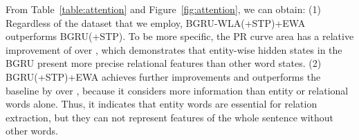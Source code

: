 \documentclass[11pt,a4paper]{article}
\begin{document}
  \begin{table*}[htbp]
    \centering
    \caption{P@N for relation extraction in the entity pairs with different number of sentences}
    \label{table:P@N}
  \end{table*}

  From Table~\ref{table:attention} and Figure~\ref{fig:attention}, we can obtain: (1) Regardless of the dataset that we employ, BGRU-WLA(+STP)+EWA outperforms BGRU(+STP). To be more specific, the PR curve area has a relative improvement of over , which demonstrates that entity-wise hidden states in the BGRU present more precise relational features than other word states. (2) BGRU(+STP)+EWA achieves further improvements and outperforms the baseline by over , because it considers more information than entity or relational words alone. Thus, it indicates that entity words are essential for relation extraction, but they can not represent features of the whole sentence without other words.
\end{document}
